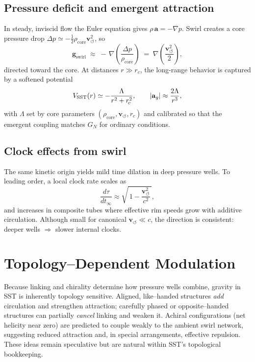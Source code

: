 \documentclass[11pt]{article}
\newcommand{\vcirc}{\mathbf{v}_{\scriptscriptstyle\boldsymbol{\circlearrowleft}}}
\newcommand{\rcore}{r_{\!c}}
\newcommand{\rhocore}{\rho_{\text{core}}}
\newcommand{\LambdaS}{\Lambda}
\begin{document}
        \subsection{Pressure deficit and emergent attraction}
            In steady, inviscid flow the Euler equation gives $\rho\,\mathbf{a} = -\nabla p$.
            Swirl creates a core pressure drop $\Delta p \simeq -\tfrac{1}{2}\rhocore \vcirc^2$, so
            \begin{equation}
                \mathbf{g}_{\text{swirl}} \;\approx\; -\,\nabla\!\left(\frac{\Delta p}{\rhocore}\right) \;=\; \nabla\!\left(\frac{\vcirc^2}{2}\right),
            \end{equation}
            directed toward the core.
            At distances $r\gg \rcore$, the long-range behavior is captured by a softened potential
            \begin{equation}
                V_{\text{SST}}(r) \simeq -\frac{\LambdaS}{r^2+\rcore^2}, \qquad
                |{\bf a}_g| \approx \frac{2\LambdaS}{r^3},
            \end{equation}
            with $\LambdaS$ set by core parameters $(\rhocore,\vcirc,\rcore)$ and calibrated so that the emergent coupling matches $G_N$ for ordinary conditions.

        \subsection{Clock effects from swirl}
            The same kinetic origin yields mild time dilation in deep pressure wells.
            To leading order, a local clock rate scales as
            \begin{equation}
                \frac{d\tau}{dt_\infty} \approx \sqrt{\,1-\frac{\vcirc^2}{c^2}\,},
            \end{equation}
            and increases in composite tubes where effective rim speeds grow with additive circulation.
            Although small for canonical $\vcirc \ll c$, the direction is consistent: deeper wells $\Rightarrow$ slower internal clocks.

    \section{Topology–Dependent Modulation}
        Because linking and chirality determine how pressure wells combine, gravity in SST is inherently topology sensitive.
        Aligned, like–handed structures \emph{add} circulation and strengthen attraction; carefully phased or opposite–handed structures can partially \emph{cancel} linking and weaken it.
        Achiral configurations (net helicity near zero) are predicted to couple weakly to the ambient swirl network, suggesting reduced attraction and, in special arrangements, effective repulsion.
        These ideas remain speculative but are natural within SST’s topological bookkeeping.
\end{document}
